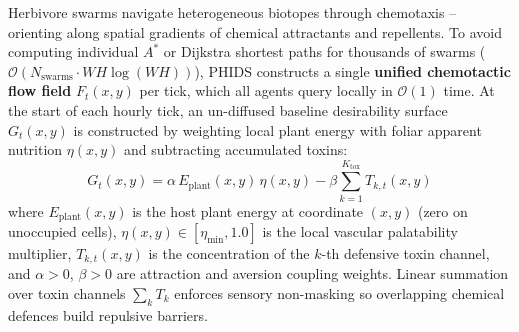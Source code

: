 Herbivore swarms navigate heterogeneous biotopes through chemotaxis -- orienting along spatial gradients of chemical attractants and repellents. To avoid computing individual $A^*$ or Dijkstra shortest paths for thousands of swarms ($\mathcal{O}(N_{\text{swarms}} \cdot W H \log(WH))$), PHIDS constructs a single \textbf{unified chemotactic flow field} $F_t(x, y)$ per tick, which all agents query locally in $\mathcal{O}(1)$ time. At the start of each hourly tick, an un-diffused baseline desirability surface $G_t(x, y)$ is constructed by weighting local plant energy with foliar apparent nutrition $\eta(x, y)$ and subtracting accumulated toxins:
\begin{equation}
  G_t(x, y) = \alpha \, E_{\text{plant}}(x, y) \, \eta(x, y) - \beta \sum_{k=1}^{K_{\text{tox}}} T_{k,t}(x, y)
  \label{eq:baseline_gradient}
\end{equation}
where $E_{\text{plant}}(x, y)$ is the host plant energy at coordinate $(x, y)$ (zero on unoccupied cells), $\eta(x, y) \in [\eta_{\min}, 1.0]$ is the local vascular palatability multiplier, $T_{k,t}(x, y)$ is the concentration of the $k$-th defensive toxin channel, and $\alpha > 0$, $\beta > 0$ are attraction and aversion coupling weights. Linear summation over toxin channels $\sum_k T_k$ enforces sensory non-masking so overlapping chemical defences build repulsive barriers.

